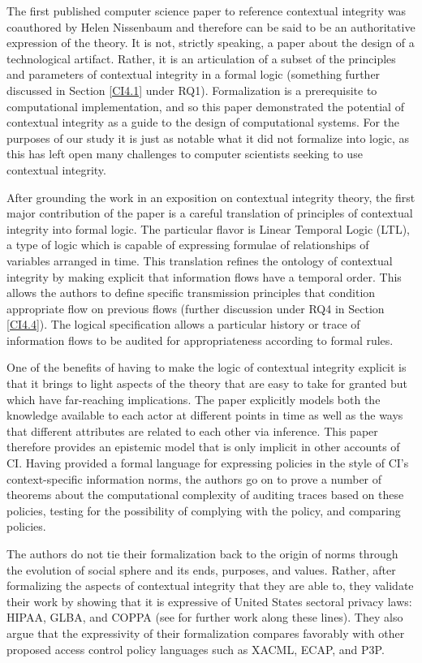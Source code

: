 \documentclass[../thesis.tex]{subfiles}
\begin{document}
The first published computer science paper to reference contextual
integrity was coauthored by Helen Nissenbaum and therefore can be said
to be an authoritative expression of the theory. It is not, strictly
speaking, a paper about the design of a technological artifact. Rather,
it is an articulation of a subset of the principles and parameters of
contextual integrity in a formal logic (something further discussed in
Section \ref{CI4.1} under RQ1). Formalization is a prerequisite to
computational implementation, and so this paper demonstrated the
potential of contextual integrity as a guide to the design of
computational systems. For the purposes of our study it is just as
notable what it did not formalize into logic, as this has left open
many challenges to computer scientists seeking to use contextual
integrity.

After grounding the work in an exposition on contextual integrity
theory, the first major contribution of the paper is a careful
translation of principles of contextual integrity into formal logic.
The particular flavor is Linear Temporal Logic (LTL), a type of logic
which is capable of expressing formulae of relationships of variables
arranged in time. This translation refines the ontology of contextual
integrity by making explicit that information flows have a temporal
order. This allows the authors to define specific transmission
principles that condition appropriate flow on previous flows (further
discussion under RQ4 in Section \ref{CI4.4}). The logical specification allows
a particular history or trace of information flows to be audited for
appropriateness according to formal rules.

One of the benefits of having to make the logic of contextual
integrity
explicit is that it brings to light aspects of the theory
that are easy
to take for granted but which have far-reaching implications.
The paper
explicitly models both the knowledge available to each actor at
different points in time as well as the ways that different attributes
are related to each other via inference. This paper therefore provides
an epistemic model that is only implicit in other accounts of CI.
Having provided a formal language for expressing policies in the style
of CI's context-specific information norms, the authors
go on to prove a number of theorems about the computational complexity
of auditing traces based on these policies, testing for the possibility
of complying with the policy, and comparing policies.

The authors do not tie their formalization back to the origin of norms
through the evolution of social sphere and its ends, purposes, and
values. Rather, after formalizing the aspects of contextual integrity
that they are able to, they validate their work by showing that it is
expressive of United States sectoral privacy laws: HIPAA, GLBA, and
COPPA (see \citet{datta2011understanding} for further work along these lines).
They also argue that the expressivity of their formalization compares
favorably with other proposed access control policy languages such as
XACML, ECAP, and P3P.
\end{document}
